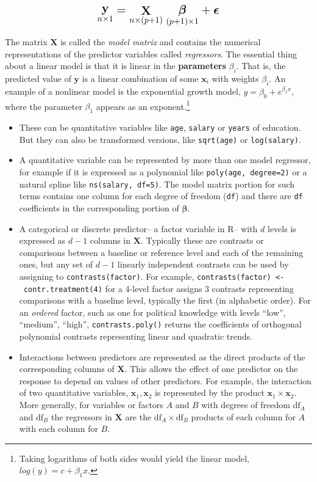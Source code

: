 \documentclass[
  letterpaper,
  10pt,
  krantz2]{krantz}
\begin{document}
\[
\Large{\mathord{\mathop{\mathbf{y}}\limits_{n \times 1}} = \mathord{\mathop{\mathbf{X}}\limits_{n \times (p+1)}}\; \mathord{\mathop{\mathbf{\boldsymbol{\beta}}}\limits_{(p+1) \times 1}} + \boldsymbol{\epsilon}}
\]

The matrix \(\mathbf{X}\) is called the \emph{model matrix} and contains
the numerical representations of the predictor variables called
\emph{regressors}. The essential thing about a linear model is that it
is linear in the \textbf{parameters} \(\beta_i\). That is, the predicted
value of \(\mathbf{y}\) is a linear combination of some \(\mathbf{x}_i\)
with weights \(\beta_i\). An example of a nonlinear model is the
exponential growth model, \(y = \beta_0 + e^{\beta_1 x}\), where the
parameter \(\beta_1\) appears as an exponent.\footnote{Taking logarithms
  of both sides would yield the linear model,
  \(log(y) = c + \beta_1 x\).}

\begin{itemize}
\item
  These can be quantitative variables like \texttt{age}, \texttt{salary}
  or \texttt{years} of education. But they can also be transformed
  versions, like \texttt{sqrt(age)} or \texttt{log(salary)}.
\item
  A quantitative variable can be represented by more than one model
  regressor, for example if it is expressed as a polynomial like
  \texttt{poly(age,\ degree=2)} or a natural spline like
  \texttt{ns(salary,\ df=5)}. The model matrix portion for such terms
  contains one column for each degree of freedom (\texttt{df}) and there
  are \texttt{df} coefficients in the corresponding portion of
  \(\boldsymbol{\beta}\).
\item
  A categorical or discrete predictor-- a factor variable in R-- with
  \(d\) levels is expressed as \(d - 1\) columns in \(\mathbf{X}\).
  Typically these are contrasts or comparisons between a baseline or
  reference level and each of the remaining ones, but any set of
  \(d - 1\) linearly independent contrasts can be used by assigning to
  \texttt{contrasts(factor)}. For example,
  \texttt{contrasts(factor)\ \textless{}-\ contr.treatment(4)} for a
  4-level factor assigns 3 contrasts representing comparisons with a
  baseline level, typically the first (in alphabetic order). For an
  \emph{ordered} factor, such as one for political knowledge with levels
  ``low'', ``medium'', ``high'', \texttt{contrasts.poly()} returns the
  coefficients of orthogonal polynomial contrasts representing linear
  and quadratic trends.
\item
  Interactions between predictors are represented as the direct products
  of the corresponding columns of \(\mathbf{X}\). This allows the effect
  of one predictor on the response to depend on values of other
  predictors. For example, the interaction of two quantitative
  variables, \(\mathbf{x}_1, \mathbf{x}_2\) is represented by the
  product \(\mathbf{x}_1 \times \mathbf{x}_2\). More generally, for
  variables or factors \(A\) and \(B\) with degrees of freedom
  \(\text{df}_A\) and \(\text{df}_B\) the regressors in \(\mathbf{X}\)
  are the \(\text{df}_A \times \text{df}_B\) products of each column for
  \(A\) with each column for \(B\).
\end{itemize}
\end{document}
